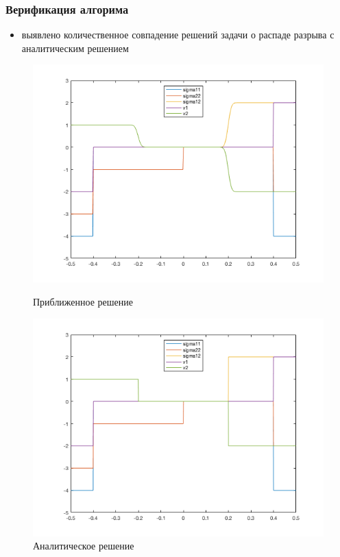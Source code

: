 \documentclass[unicode,aspectratio=43]{beamer}
\begin{document}
\begin{frame}\frametitle{Верификация алгорима}
	\begin{itemize}
		\item выявлено количественное совпадение решений задачи о распаде разрыва с аналитическим решением
	\end{itemize}
	\begin{figure}[ht!]
		\centering
		\begin{minipage}{0.5\textwidth}
			\includegraphics[width=\textwidth]{graph_test}
			\captionsetup{labelformat=empty}
			\caption{Приближенное решение}
		\end{minipage}
		\hfill
		\begin{minipage}{0.49\textwidth}
			\includegraphics[width=\textwidth]{test_analyt}
			\captionsetup{labelformat=empty}
			\caption{Аналитическое решение}
		\end{minipage}
	\end{figure}
\end{frame}	
\end{document}
